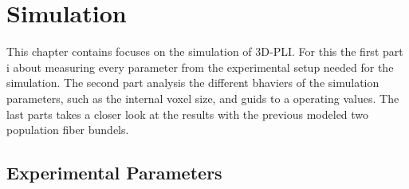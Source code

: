\setcounter{chapter}{7}
\chapter{Simulation}
\label{cha:simulation_analysis}
% 
% 
% 
This chapter contains focuses on the simulation of \ac{3D-PLI}.
For this the first part i about measuring every parameter from the experimental setup needed for the simulation.
The second part analysis the different bhaviers of the simulation parameters, such as the internal voxel size, and guids to a operating values.
The last parts takes a closer look at the results with the previous modeled two population fiber bundels.
% 
\section{Experimental Parameters}
% 
% 
% 
